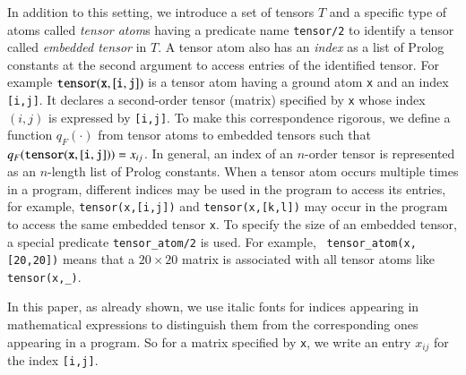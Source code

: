 \documentclass[a4paper]{report}
\newcommand{\mmat}[1]{\mathbf{#1}}
\newcommand{\tensor}{\mbox{\tt tensor}}
\newcommand{\indexfunc}{T}
\begin{document}
In addition to this  setting, we introduce a set of  tensors $T$ and a
specific type of atoms called  {\em tensor atom\/}s having a predicate
name  {\tt  tensor/2}  to  identify  a  tensor  called  {\em  embedded
	tensor\/} in $T$.  A  tensor atom also has an {\em  index\/} as a list
of Prolog  constants at the second  argument to access entries  of the
identified tensor.   For example  ${\tt tensor(x,[i,j])}$ is  a tensor
atom  having a  ground  atom {\tt  x}  and an  index  {\tt [i,j]}.  It
declares a  second-order tensor  (matrix) specified  by {\tt  x} whose
index $(i,j)$ is expressed by {\tt [i,j]}. To make this correspondence
rigorous,  we define  a  function $q_F(\cdot)$  from  tensor atoms  to
embedded  tensors such  that  $q_F({\tt tensor(x,[i,j])})=x_{ij}$.  In
general,  an  index  of  an  $n$-order tensor  is  represented  as  an
$n$-length  list  of  Prolog  constants. When  a  tensor  atom  occurs
multiple times  in a  program, different  indices may  be used  in the
program to access its entries,  for example, {\tt tensor(x,[i,j])} and
{\tt  tensor(x,[k,l])} may  occur in  the program  to access  the same
embedded tensor {\tt x}.  To specify the size of an embedded tensor, a
special  predicate {\tt  tensor\_atom/2}  is used.  For example,  {\tt
	tensor\_atom(x,[20,20])}  means  that  a  $20  \times  20$  matrix  is
associated with all tensor atoms like {\tt tensor(x,\_)}.

In  this paper,  as already  shown, we  use italic  fonts for  indices
appearing  in mathematical  expressions to  distinguish them  from the
corresponding ones appearing  in a program. So for  a matrix specified
by {\tt x}, we write an entry $x_{ij}$ for the index {\tt [i,j]}.


\end{document}
